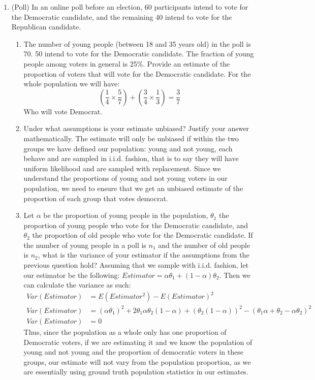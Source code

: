 \documentclass[12pt,twoside]{article}
\begin{document}
\begin{enumerate}
\item (Poll) In an online poll before an election, 60 participants intend to vote for the Democratic candidate, and the remaining 40 intend to vote for the Republican candidate.  
\begin{enumerate}
\item The number of young people (between 18 and 35 years old) in the poll is 70. 50 intend to vote for the Democratic candidate. The fraction of young people among voters in general is 25\%. Provide an estimate of the proportion of voters that will vote for the Democratic candidate. 
\subitem
For the whole population we will have:
$$
    (\frac{1}{4} \times \frac{5}{7} ) + (\frac{3}{4} \times \frac{1}{3}) = \frac{3}{7}
$$
Who will vote Democrat.
\item Under what assumptions is your estimate unbiased? Justify your answer mathematically.
\subitem
The estimate will only be unbiased if within the two groups we have defined our population: young and not young, each behave and are sampled in i.i.d. fashion, that is to say they will have uniform likelihood and are sampled with replacement. Since we understand the proportions of young and not young voters in our population, we need to ensure that we get an unbiased estimate of the proportion of each group that votes democrat.
\item Let $\alpha$ be the proportion of young people in the population, $\theta_1$ the proportion of young people who vote for the Democratic candidate, and  $\theta_2$ the proportion of old people who vote for the Democratic candidate. If the number of young people in a poll is $n_1$ and the number of old people is $n_2$, what is the variance of your estimator if the assumptions from the previous question hold? 
\subitem 
Assuming that we sample with i.i.d. fashion, let our estimator be the following: $Estimator = \alpha \theta_1 + (1-\alpha)\theta_2$. Then we can calculate the variance as such:
\begin{equation}
    \begin{split}
    Var(Estimator) &= E(Estimator^2) - E(Estimator)^2 \\
    Var(Estimator) &= (\alpha \theta_1)^2 + 2\theta_1 \alpha \theta_2 (1-\alpha) + (\theta_2(1-\alpha))^2 - (\theta_1\alpha + \theta_2 - \alpha\theta_2)^2  \\
    Var(Estimator) &= 0 
    \end{split}
\end{equation}
Thus, since the population as a whole only has one proportion of Democratic voters, if we are estimating it and we know the population of young and not young and the proportion of democratic voters in these groups, our estimate will not vary from the population proportion, as we are essentially using ground truth population statistics in our estimates.
\end{enumerate}


\end{enumerate}
\end{document}
